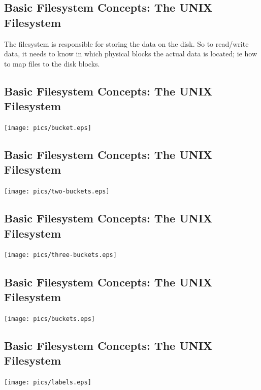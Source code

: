 \documentclass[xga]{xdvislides}
\begin{document}
\subsection{Basic Filesystem Concepts: The UNIX Filesystem}
The filesystem is responsible for storing the data on the disk.
So to read/write data, it needs to know in which physical blocks the actual
data is located; ie how to map files to the disk blocks.


\subsection{Basic Filesystem Concepts: The UNIX Filesystem}
\vspace*{\fill}
\begin{center}
\texttt{[image: pics/bucket.eps]} \\
\end{center}
\vspace*{\fill}

\subsection{Basic Filesystem Concepts: The UNIX Filesystem}
\begin{center}
\texttt{[image: pics/two-buckets.eps]} \\
\end{center}

\subsection{Basic Filesystem Concepts: The UNIX Filesystem}
\vspace*{\fill}
\begin{center}
\texttt{[image: pics/three-buckets.eps]} \\
\end{center}
\vspace*{\fill}

\subsection{Basic Filesystem Concepts: The UNIX Filesystem}
\vspace*{\fill}
\begin{center}
\texttt{[image: pics/buckets.eps]} \\
\end{center}
\vspace*{\fill}

\subsection{Basic Filesystem Concepts: The UNIX Filesystem}
\vspace*{\fill}
\begin{center}
\texttt{[image: pics/labels.eps]} \\
\end{center}
\vspace*{\fill}
\end{document}
